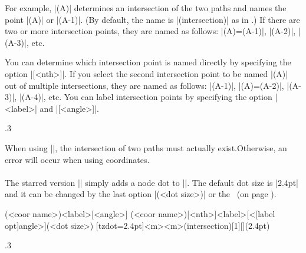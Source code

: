 For example, |(A)| determines an intersection of the two paths and names the point |(A)| or |(A-1)|. (By default, the name is |(intersection)| as in \Tikz.)
If there are two or more intersection points, they are named as follows: |(A)=(A-1)|, |(A-2)|, |(A-3)|, etc.

You can determine which intersection point is named directly by specifying the option |[<nth>]|. If you select the second intersection point to be named |(A)| out of multiple intersections, they are named as follows: |(A-1)|, |(A)=(A-2)|, |(A-3)|, |(A-4)|, etc.
You can label intersection points by specifying the option |{<label>}| and |[<angle>]|.


\begin{tzcode}{.3}
{}
\end{tzcode}

\warning When using |\tzXpoint|, the intersection of two paths must actually exist.Otherwise, an error will occur when using coordinates.

\paragraph{\icmd{\tzXpoint*}} The starred version |\tzXpoint*| simply adds a node dot to |\tzXpoint|.
The default dot size is |2.4pt| and it can be changed by the last option |(<dot size>)| or the \threeways\ (on page \pageref{ss:threeways}).

\begin{tzdef}{}
(<coor name>){<label>}[<angle>]
          (<coor name>)[<nth>]{<label>}[<[label opt]angle>](<dot size>)
  [tzdot=2.4pt]{<m>}{<m>}(intersection)[1]{}[](2.4pt)
\end{tzdef}


\begin{tzcode}{.3}
{}
\end{tzcode}


